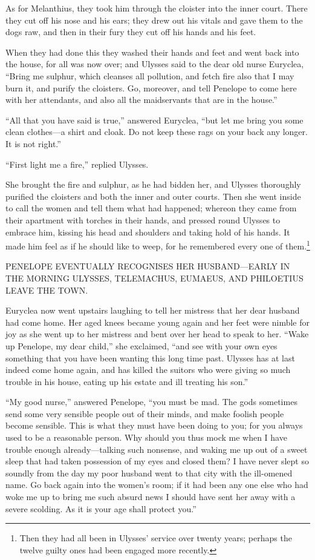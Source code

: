 As for Melanthius, they took him through the cloister into the inner court.
There they cut off his nose and his ears; they drew out his vitals and gave
them to the dogs raw, and then in their fury they cut off his hands and his
feet.

When they had done this they washed their hands and feet and went back into the
house, for all was now over; and Ulysses said to the dear old nurse Euryclea,
“Bring me sulphur, which cleanses all pollution, and fetch fire also that I may
burn it, and purify the cloisters. Go, moreover, and tell Penelope to come here
with her attendants, and also all the maidservants that are in the house.”

“All that you have said is true,” answered Euryclea, “but let me bring you some
clean clothes—a shirt and cloak. Do not keep these rags on your back any
longer. It is not right.”

“First light me a fire,” replied Ulysses.

She brought the fire and sulphur, as he had bidden her, and Ulysses thoroughly
purified the cloisters and both the inner and outer courts. Then she went
inside to call the women and tell them what had happened; whereon they came
from their apartment with torches in their hands, and pressed round Ulysses to
embrace him, kissing his head and shoulders and taking hold of his hands. It
made him feel as if he should like to weep, for he remembered every one of
them.\footnote{Then they had all been in Ulysses’ service over twenty years; perhaps the
twelve guilty ones had been engaged more recently.}


PENELOPE EVENTUALLY RECOGNISES HER HUSBAND—EARLY IN THE MORNING ULYSSES,
TELEMACHUS, EUMAEUS, AND PHILOETIUS LEAVE THE TOWN.

Euryclea now went upstairs laughing to tell her mistress that her dear husband
had come home. Her aged knees became young again and her feet were nimble for
joy as she went up to her mistress and bent over her head to speak to her.
“Wake up Penelope, my dear child,” she exclaimed, “and see with your own eyes
something that you have been wanting this long time past. Ulysses has at last
indeed come home again, and has killed the suitors who were giving so much
trouble in his house, eating up his estate and ill treating his son.”

“My good nurse,” answered Penelope, “you must be mad. The gods sometimes send
some very sensible people out of their minds, and make foolish people become
sensible. This is what they must have been doing to you; for you always used to
be a reasonable person. Why should you thus mock me when I have trouble enough
already—talking such nonsense, and waking me up out of a sweet sleep that had
taken possession of my eyes and closed them? I have never slept so soundly from
the day my poor husband went to that city with the ill-omened name. Go back
again into the women’s room; if it had been any one else who had woke me up to
bring me such absurd news I should have sent her away with a severe scolding.
As it is your age shall protect you.”

